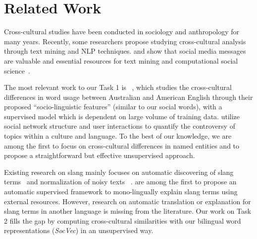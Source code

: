 \section{Related Work}
\label{sec:related}
Cross-cultural studies have been conducted in 
sociology and anthropology for many years. 
Recently, some researchers propose 
studying cross-cultural analysis through text mining and NLP techniques.
\cite{nakasaki2009visualizing} and 
\cite{elahi2012examination} show that 
social media messages  are valuable and essential resources for text mining and computational social science~\cite{Petrovic2010StreamingFS,Ritter2011NamedER,Paul2011YouAW,Rosenthal2015ICA,Wang2015ThatsSA,Rosenthal2015ICA,Zhang2015ContextawareEM,Peng2016ImprovingNE}. 

The most relevant work to our Task 1 is ~\cite{Garimella2016IdentifyingCD}, which studies the cross-cultural 
differences in word usage between Australian and American English through 
their proposed ``socio-linguistic features'' (similar to our social words), with a supervised model which is dependent on large volume of training data. 
\cite{Garimella2016QuantifyingCI} utilize social network structure and user interactions to quantify the controversy of topics within a culture and language.
To the best of our knowledge, we are among the first to focus on cross-cultural differences in named entities and to propose a straightforward but effective unsupervised approach.

Existing research on slang mainly focuses on automatic 
discovering of slang terms~\cite{elsahar2014a} and normalization of noisy texts ~\cite{han2012automatically}. 
\cite{ni2017learning} are among the first to propose an automatic 
supervised framework to mono-lingually explain slang terms using 
external resources.
However, research on automatic translation or explanation for slang terms 
in another language is missing from the literature. 
Our work on Task 2 fills the gap by computing cross-cultural similarities 
with our bilingual word representations (\textit{SocVec}) in an 
unsupervised way.

